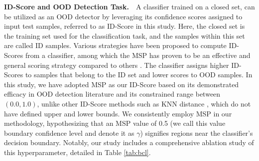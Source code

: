 

\textbf{ID-Score and OOD Detection Task.}\ \  A classifier trained on a closed set, can be utilized as an OOD detector by leveraging its confidence scores assigned to input test samples, referred to as ID-Score in this study. Here, the closed set is the training set used for the classification task, and the samples within this set are called ID samples. Various strategies have been proposed to compute ID-Scores from a classifier, among which the MSP has proven to be an effective and general scoring strategy compared to others \cite{liang2017enhancing,kong2021opengan,fort2021exploring,hendrycks2016baseline,ruff2021unifying,salehi2021unified}. The classifier assigns higher ID-Scores to samples that belong to the ID set and lower scores to OOD samples. In this study, we have adopted MSP as our ID-Score based on its demonstrated efficacy in OOD detection literature \cite{msp} and its constrained range between $(0.0, 1.0)$, unlike other ID-Score methods such as KNN distance \cite{sun2022out}, which do not have defined upper and lower bounds. We consistently employ MSP in our methodology, hypothesizing that an MSP value of 0.5 (we call this value boundary confidence level and denote it as $\gamma$) signifies regions near the classifier's decision boundary. Notably, our study includes a comprehensive ablation study of this hyperparameter, detailed in Table \ref{tab:bcl}.






